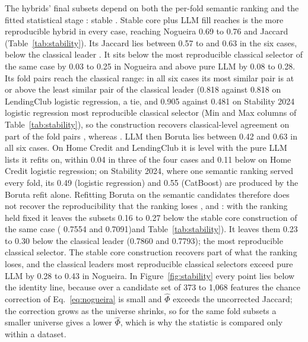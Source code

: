 \documentclass[final,5p,twocolumn]{elsarticle}
\providecommand{\DIFaddtex}[1]{{\protect\color{blue} \sf #1}} %
\providecommand{\DIFdeltex}[1]{{\protect\color{red} \scriptsize #1}} %
\providecommand{\DIFaddbegin}{} %
\providecommand{\DIFaddend}{} %
\providecommand{\DIFdelbegin}{} %
\providecommand{\DIFdelend}{} %
\providecommand{\DIFadd}[1]{\texorpdfstring{\DIFaddtex{#1}}{#1}} %
\providecommand{\DIFdel}[1]{\texorpdfstring{\DIFdeltex{#1}}{}} %
\begin{document}
\DIFaddend The hybrids' final subsets depend on both the per-fold semantic ranking and the fitted statistical stage\DIFdelbegin \DIFdel{: stable }\DIFdelend \DIFaddbegin \DIFadd{. Stable }\DIFaddend core plus LLM fill \DIFdelbegin \DIFdel{reaches }\DIFdelend \DIFaddbegin \DIFadd{is the more reproducible hybrid in every case, reaching }\DIFaddend Nogueira 0.69 to 0.76 \DIFdelbegin \DIFdel{and Jaccard }\DIFdelend \DIFaddbegin \DIFadd{(Table~\ref{tab:stability}). Its Jaccard lies between }\DIFaddend 0.57 \DIFdelbegin \DIFdel{to }\DIFdelend \DIFaddbegin \DIFadd{and }\DIFaddend 0.63\DIFdelbegin \DIFdel{in the six cases, below the classical leader }\DIFdelend \DIFaddbegin \DIFadd{. It sits below the most reproducible classical selector }\DIFaddend of the same case by 0.03 to 0.25 in Nogueira and above pure LLM by 0.08 to 0.28. Its fold pairs reach the classical range: in all six cases its most similar pair is at or above the least similar pair of the \DIFdelbegin \DIFdel{classical leader (0.818 against 0.818 on LendingClub logistic regression, a tie, and 0.905 against 0.481 on Stability 2024 logistic regression}\DIFdelend \DIFaddbegin \DIFadd{most reproducible classical selector (Min and Max columns of Table~\ref{tab:stability}}\DIFaddend ), so the construction recovers classical-level agreement on part of the fold pairs\DIFdelbegin \DIFdel{, whereas }\DIFdelend \DIFaddbegin \DIFadd{. }\DIFaddend LLM then Boruta lies between 0.42 and 0.63 in all six cases. On Home Credit and LendingClub it is level with the pure LLM lists it refits on, within 0.04 in three of the four cases and 0.11 below on Home Credit logistic regression; on Stability 2024, where one semantic ranking served every fold, its 0.49 (logistic regression) and 0.55 (CatBoost) are produced by the Boruta refit alone. Refitting Boruta on the semantic candidates therefore does not recover the reproducibility that the ranking loses\DIFdelbegin \DIFdel{, and }\DIFdelend \DIFaddbegin \DIFadd{: }\DIFaddend with the ranking held fixed it leaves the subsets 0.16 to 0.27 below the stable core construction of the same case (\DIFdelbegin \DIFdel{0.7554 and 0.7091)and }\DIFdelend \DIFaddbegin \DIFadd{Table~\ref{tab:stability}). It leaves them }\DIFaddend 0.23 to 0.30 below the \DIFdelbegin \DIFdel{classical leader (0.7860 and 0.7793); the }\DIFdelend \DIFaddbegin \DIFadd{most reproducible classical selector. The }\DIFaddend stable core construction recovers part of what the ranking loses, and the \DIFdelbegin \DIFdel{classical leaders }\DIFdelend \DIFaddbegin \DIFadd{most reproducible classical selectors }\DIFaddend exceed pure LLM by 0.28 to 0.43 in Nogueira. In Figure~\ref{fig:stability} every point lies below the identity line, because over a candidate set of 373 to 1,068 features the chance correction of Eq.~\eqref{eq:nogueira} is small and $\hat\Phi$ exceeds the uncorrected Jaccard; the correction grows as the universe shrinks, so for the same fold subsets a smaller universe gives a lower $\hat\Phi$, which is why the statistic is compared only within a dataset.
\end{document}
